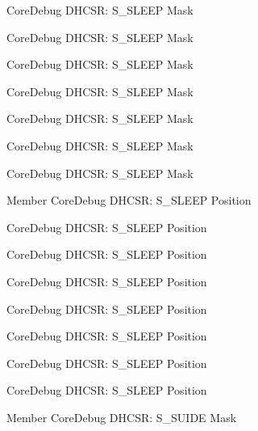 \begin{DoxyRefList}
\label{deprecated__deprecated000577}%
%
Core\+Debug DHCSR\+: S\+\_\+\+SLEEP Mask 

\label{deprecated__deprecated000170}%
%
Core\+Debug DHCSR\+: S\+\_\+\+SLEEP Mask 

\label{deprecated__deprecated000312}%
%
Core\+Debug DHCSR\+: S\+\_\+\+SLEEP Mask 

\label{deprecated__deprecated000024}%
%
Core\+Debug DHCSR\+: S\+\_\+\+SLEEP Mask 

\label{deprecated__deprecated000116}%
%
Core\+Debug DHCSR\+: S\+\_\+\+SLEEP Mask 

\label{deprecated__deprecated000255}%
%
Core\+Debug DHCSR\+: S\+\_\+\+SLEEP Mask 

\label{deprecated__deprecated000475}%
%
Core\+Debug DHCSR\+: S\+\_\+\+SLEEP Mask  
\item[Member \doxylink{group__CMSIS__CoreDebug_ga349ccea33accc705595624c2d334fbcb}{Core\+Debug\+\_\+\+DHCSR\+\_\+\+S\+\_\+\+SLEEP\+\_\+\+Pos} ]\label{deprecated__deprecated000169}%
%
Core\+Debug DHCSR\+: S\+\_\+\+SLEEP Position 

\label{deprecated__deprecated000576}%
%
Core\+Debug DHCSR\+: S\+\_\+\+SLEEP Position 

\label{deprecated__deprecated000115}%
%
Core\+Debug DHCSR\+: S\+\_\+\+SLEEP Position 

\label{deprecated__deprecated000311}%
%
Core\+Debug DHCSR\+: S\+\_\+\+SLEEP Position 

\label{deprecated__deprecated000474}%
%
Core\+Debug DHCSR\+: S\+\_\+\+SLEEP Position 

\label{deprecated__deprecated000254}%
%
Core\+Debug DHCSR\+: S\+\_\+\+SLEEP Position 

\label{deprecated__deprecated000023}%
%
Core\+Debug DHCSR\+: S\+\_\+\+SLEEP Position 

\label{deprecated__deprecated000387}%
%
Core\+Debug DHCSR\+: S\+\_\+\+SLEEP Position  
\item[Member \doxylink{group__CMSIS__SCB_gad37656791dbb216ffb194995f28c412c}{Core\+Debug\+\_\+\+DHCSR\+\_\+\+S\+\_\+\+SUIDE\+\_\+\+Msk} ]\label{deprecated__deprecated000569}%
%
Core\+Debug DHCSR\+: S\+\_\+\+SUIDE Mask 


\end{DoxyRefList}
